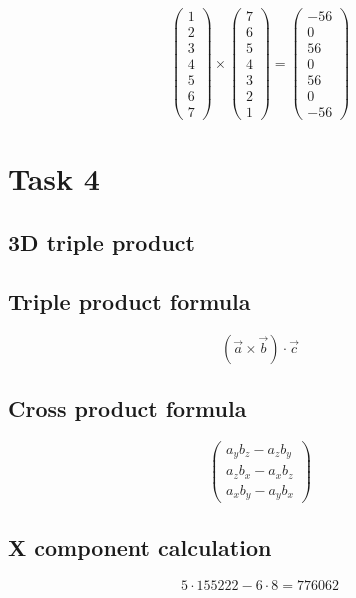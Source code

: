 \documentclass{article}
\begin{document}
\[
\begin{pmatrix}1 \\ 2 \\ 3 \\ 4 \\ 5 \\ 6 \\ 7\end{pmatrix} \times \begin{pmatrix}7 \\ 6 \\ 5 \\ 4 \\ 3 \\ 2 \\ 1\end{pmatrix} = \begin{pmatrix}-56 \\ 0 \\ 56 \\ 0 \\ 56 \\ 0 \\ -56\end{pmatrix}
\]
\bigskip

\hrulefill
\bigskip

\section*{Task 4}

\subsection*{3D triple product}
\subsection*{ \vspace{1em} Triple product formula}
\[
(\vec{a} \times \vec{b}) \cdot \vec{c}
\]
\subsection*{ \vspace{1em} Cross product formula}
\[
\begin{pmatrix}
a_y b_z - a_z b_y \\
a_z b_x - a_x b_z \\
a_x b_y - a_y b_x
\end{pmatrix}
\]
\subsection*{ \vspace{1em} X component calculation}
\[
5 \cdot 155222 - 6 \cdot 8 = 776062
\]
\end{document}
